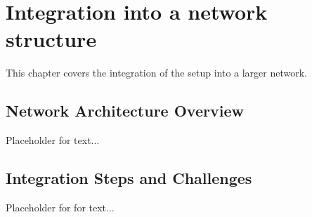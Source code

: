 \section{Integration into a network structure}
\label{sec:network-integration}

This chapter covers the integration of the setup into a larger network.

\subsection{Network Architecture Overview}
Placeholder for text...

\subsection{Integration Steps and Challenges}
Placeholder for for text...